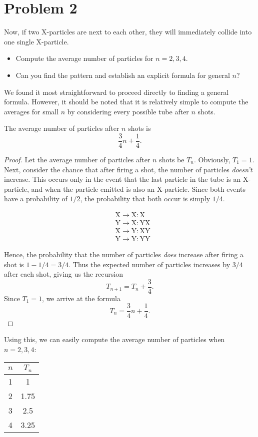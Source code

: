 \section{Problem 2}
\hypertarget{p2}{}
Now, if two X-particles are next to each other, they will immediately collide into one single X-particle.
\begin{itemize}
  \item Compute the average number of particles for $n = 2, 3, 4$.
  \item Can you find the pattern and establish an explicit formula for general $n$?
\end{itemize}

We found it most straightforward to proceed directly to finding a general formula. However, it should be noted that it is relatively simple to compute the averages for small $n$ by considering every possible tube after $n$ shots.

\begin{theorem}\label{thm:2}
  The average number of particles after $n$ shots is \[
  \frac{3}{4}n + \frac{1}{4}
  .\]
\end{theorem}
\begin{proof}
  Let the average number of particles after $n$ shots be $T_n$. Obviously, $T_1 = 1$. Next, consider the chance that after firing a shot, the number of particles \emph{doesn't} increase. This occurs only in the event that the last particle in the tube is an X-particle, and when the particle emitted is also an X-particle. Since both events have a probability of $1 / 2$, the probability that both occur is simply $1 / 4$. 
  \begin{figure}[H]
    \vspace{-1.5em}
    \begin{align*}
    &\text{X} \to \text{X}: \text{X} \\
    &\text{Y} \to \text{X}: \text{YX} \\
    &\text{X} \to \text{Y}: \text{XY} \\
    &\text{Y} \to \text{Y}: \text{YY}
    \end{align*}
    \vspace{-3em}
  \end{figure}
  Hence, the probability that the number of particles \emph{does} increase after firing a shot is $1 -1 / 4 = 3 / 4$. Thus the expected number of particles increases by $3 / 4$ after each shot, giving us the recursion \[
    T_{n+1} = T_{n} + \frac{3}{4}
  .\] Since $T_1 = 1$, we arrive at the formula \[
    T_{n} = \frac{3}{4}n + \frac{1}{4} \tag*{\qedhere}
  .\] 
\end{proof}

Using this, we can easily compute the average number of particles when $n = 2, 3, 4$:
\begin{table}[H]
  \centering
  \begin{tabular}{cc}
    \toprule
    $n$ & $T_n$ \\
    \midrule
    1 & 1 \\
    2 & 1.75 \\
    3 & 2.5 \\
    4 & 3.25 \\
    \bottomrule
  \end{tabular}
\end{table}

